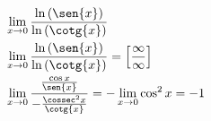 \begin{ex}
\begin{align}
&\lim_{x\rightarrow 0} \frac{\ln{(\sen{x})}}{\ln{(\cotg{x})}}\nonumber\\
&\lim_{x\rightarrow 0} \frac{\ln{(\sen{x})}}{\ln{(\cotg{x})}}=\left[\frac{\infty}{\infty}\right]\nonumber\\
&\lim_{x\rightarrow 0} \frac{\frac{\cos{x}}{\sen{x}}}{-\frac{\cossec^2{x}}{\cotg{x}}}=-\lim_{x\rightarrow 0}\cos^2{x}=-1\nonumber
\end{align}
\end{ex}